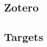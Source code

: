 \documentclass[12pt]{article}
\begin{document}
\subsection{Zotero}
\subsection{Targets}




% 

% 
\end{document}
